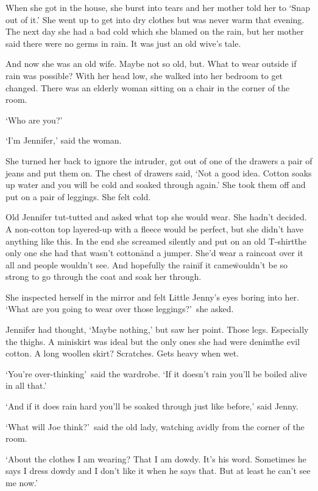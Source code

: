 When she got in the house, she burst into tears and her mother told 
her to `Snap out of it.' She went up to get into dry clothes but 
was never warm that evening. The next day she had a bad cold which 
she blamed on the rain, but her mother said there were no germs in 
rain. It was just an old wive's tale.

And now she was an old wife. Maybe not so old, but. What to wear 
outside if rain was possible? With her head low, she walked 
into her bedroom to get changed. There was an elderly woman sitting on 
a chair in the corner of the room.

`Who are you?'

`I'm Jennifer,' said the woman.

She turned her back to ignore the intruder, got out of one of the 
drawers a pair of jeans and put them on. The chest of drawers 
said, `Not a good idea. Cotton soaks up water and you will be cold 
and soaked through again.' She took them off and put on a pair of 
leggings. She felt cold.

Old Jennifer tut-tutted and asked what top she would wear. She 
hadn't decided. A non-cotton top layered-up with a fleece would be 
perfect, but she didn't have anything like this. In the end she 
screamed silently and put on an old T-shirt\=the only one she had 
that wasn't cotton\=and a jumper. She'd wear a raincoat over it all 
and people wouldn't see. And hopefully the rain\=if it 
came\=wouldn't be so strong to go through the coat and soak her 
through.

She inspected herself in the mirror and felt Little Jenny's eyes 
boring into her. `What are you going to wear over those 
leggings?'~she asked.

Jennifer had thought, `Maybe nothing,' but saw her point. Those legs. 
Especially the thighs. A miniskirt was ideal but the only ones she 
had were denim\=the evil cotton. A long woollen skirt? Scratches. 
Gets heavy when wet.

`You're over-thinking'~said the wardrobe. `If it doesn't rain 
you'll be boiled alive in all that.'

`And if it does rain hard you'll be soaked through just like 
before,' said Jenny.

`What will Joe think?'~said the old lady, watching avidly from the 
corner of the room.

`About the clothes I am wearing? That I am dowdy. It's his word. 
Sometimes he says I dress dowdy and I don't like it when he says 
that. But at least he can't see me now.'

